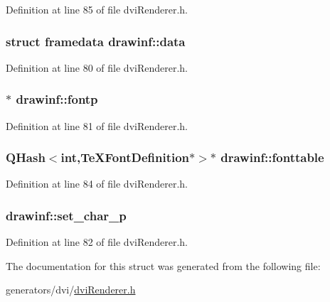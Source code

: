 Definition at line 85 of file dvi\+Renderer.\+h.

\hypertarget{structdrawinf_af73f66288002f0a25c7843a534bf1340}{
\subsubsection[{data}]{\setlength{\rightskip}{0pt plus 5cm}struct {\bf framedata} drawinf\+::data}}\label{structdrawinf_af73f66288002f0a25c7843a534bf1340}


Definition at line 80 of file dvi\+Renderer.\+h.

\hypertarget{structdrawinf_a4a6ec248b5b071099ddf9b5e4f0255e2}{
\subsubsection[{fontp}]{$\ast$ drawinf\+::fontp}}\label{structdrawinf_a4a6ec248b5b071099ddf9b5e4f0255e2}


Definition at line 81 of file dvi\+Renderer.\+h.

\hypertarget{structdrawinf_ac68bb33a017c34bf63f8dce71ad3ef17}{
\subsubsection[{fonttable}]{\setlength{\rightskip}{0pt plus 5cm}Q\+Hash$<$int,{\bf Te\+X\+Font\+Definition}$\ast$$>$$\ast$ drawinf\+::fonttable}}\label{structdrawinf_ac68bb33a017c34bf63f8dce71ad3ef17}


Definition at line 84 of file dvi\+Renderer.\+h.

\hypertarget{structdrawinf_a365a1c9700846921b83cc69e0f2780c6}{
\subsubsection[{set\+\_\+char\+\_\+p}]{ drawinf\+::set\+\_\+char\+\_\+p}}\label{structdrawinf_a365a1c9700846921b83cc69e0f2780c6}


Definition at line 82 of file dvi\+Renderer.\+h.



The documentation for this struct was generated from the following file\+:\begin{DoxyCompactItemize}
\item 
generators/dvi/\hyperlink{dviRenderer_8h}{dvi\+Renderer.\+h}\end{DoxyCompactItemize}

